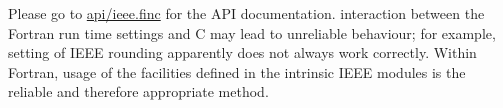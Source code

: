Please go to \hyperlink{ieee_8finc}{api/ieee.\-finc} for the A\-P\-I documentation. interaction between the Fortran run time settings and C may lead to unreliable behaviour; for example, setting of I\-E\-E\-E rounding apparently does not always work correctly. Within Fortran, usage of the facilities defined in the intrinsic I\-E\-E\-E modules is the reliable and therefore appropriate method. 